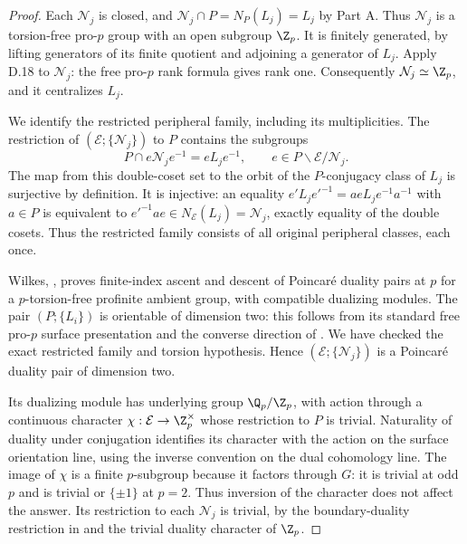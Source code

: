 \begin{proof}
Each $\mathcal N_j$ is closed, and
$\mathcal N_j\cap P=N_P(L_j)=L_j$ by Part A. Thus $\mathcal N_j$ is a torsion-free pro-$p$ group with an open subgroup $\Z_p$. It is finitely generated, by lifting generators of its finite quotient and adjoining a generator of $L_j$. Apply D.18 to $\mathcal N_j$: the free pro-$p$ rank formula gives rank one. Consequently $\mathcal N_j\simeq\Z_p$, and it centralizes $L_j$.

We identify the restricted peripheral family, including its multiplicities. The restriction of $(\mathcal E;\{\mathcal N_j\})$ to $P$ contains the subgroups
\[
 P\cap e\mathcal N_je^{-1}=eL_je^{-1},
 \qquad e\in P\backslash\mathcal E/\mathcal N_j .
\]
The map from this double-coset set to the orbit of the $P$-conjugacy class of $L_j$ is surjective by definition. It is injective: an equality
$e'L_je'^{-1}=a eL_je^{-1}a^{-1}$ with $a\in P$ is equivalent to
$e'^{-1}ae\in N_{\mathcal E}(L_j)=\mathcal N_j$, exactly equality of the double cosets. Thus the restricted family consists of all original peripheral classes, each once.

Wilkes, \cite[Proposition 5.11]{R-WilkesRelative}, proves finite-index ascent and descent of Poincar\'e duality pairs at $p$ for a $p$-torsion-free profinite ambient group, with compatible dualizing modules. The pair $(P;\{L_i\})$ is orientable of dimension two: this follows from its standard free pro-$p$ surface presentation and the converse direction of \cite[Theorem 3.3]{R-Wilkes}. We have checked the exact restricted family and torsion hypothesis. Hence $(\mathcal E;\{\mathcal N_j\})$ is a Poincar\'e duality pair of dimension two.

Its dualizing module has underlying group $\Q_p/\Z_p$, with action through a continuous character $\chi:\mathcal E\to\Z_p^\times$ whose restriction to $P$ is trivial. Naturality of duality under conjugation identifies its character with the action on the surface orientation line, using the inverse convention on the dual cohomology line. The image of $\chi$ is a finite $p$-subgroup because it factors through $G$: it is trivial at odd $p$ and is trivial or $\{\pm1\}$ at $p=2$. Thus inversion of the character does not affect the answer. Its restriction to each $\mathcal N_j$ is trivial, by the boundary-duality restriction in \cite[Proposition 5.9]{R-WilkesRelative} and the trivial duality character of $\Z_p$.


\end{proof}
